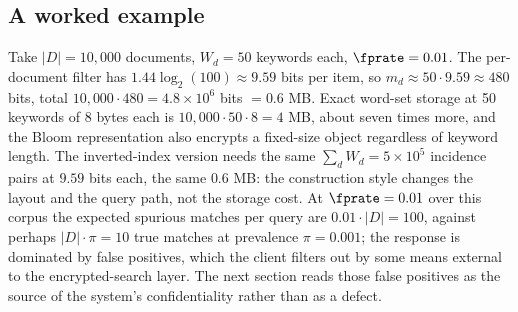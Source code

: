 \subsection*{A worked example}

Take $|D| = 10{,}000$ documents, $W_d = 50$ keywords each, $\fprate =
0.01$. The per-document filter has $1.44 \log_2(100) \approx 9.59$ bits
per item, so $m_d \approx 50 \cdot 9.59 \approx 480$ bits, total
$10{,}000 \cdot 480 = 4.8 \times 10^6$ bits $= 0.6$ MB. Exact word-set
storage at 50 keywords of 8 bytes each is $10{,}000 \cdot 50 \cdot 8 = 4$
MB, about seven times more, and the Bloom representation also encrypts a
fixed-size object regardless of keyword length. The inverted-index
version needs the same $\sum_d W_d = 5 \times 10^5$ incidence pairs at
$9.59$ bits each, the same $0.6$ MB: the construction style changes the
layout and the query path, not the storage cost. At $\fprate = 0.01$ over
this corpus the expected spurious matches per query are $0.01 \cdot |D| =
100$, against perhaps $|D| \cdot \pi = 10$ true matches at prevalence
$\pi = 0.001$; the response is dominated by false positives, which the
client filters out by some means external to the encrypted-search layer.
The next section reads those false positives as the source of the
system's confidentiality rather than as a defect.
